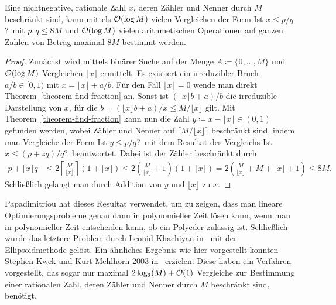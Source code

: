 \begin{theorem}\label{theorem-find-rational}
	Eine nichtnegative, rationale Zahl $x$, deren Zähler und Nenner durch $M$ beschränkt sind, kann mittels $\mathcal{O}(\log M)$ vielen Vergleichen der Form \glqq Ist $x\leq p/q$?\grqq\ mit $p,q\leq 8M$ und $\mathcal{O}(\log M)$ vielen arithmetischen Operationen auf ganzen Zahlen von Betrag maximal $8M$ bestimmt werden.
\end{theorem}
\begin{proof}
	\newcommand{\lowx}{\lfloor x \rfloor}
	Zunächst wird mittels binärer Suche auf der Menge $A\coloneq \{0,\dots, M\}$ und $\mathcal{O}(\log M)$ Vergleichen $\lowx$ ermittelt.
	Es existiert ein irreduzibler Bruch $a/b\in[0,1)$ mit $x=\lowx + a/b$.
	Für den Fall $\lowx = 0$ wende man direkt Theorem~\ref{theorem-find-fraction} an.
	Sonst ist $(\lowx b + a)/b$ die irreduzible Darstellung von $x$, für die $b = (\lowx b+a)/x \leq M/\lowx$ gilt.
	Mit Theorem~\ref{theorem-find-fraction} kann nun die Zahl $y\coloneq x-\lowx\in(0,1)$ gefunden werden, wobei Zähler und Nenner auf $\lceil M/\lowx \rceil$ beschränkt sind, indem man Vergleiche der Form \glqq Ist $y\leq p/q$?\grqq\ mit dem Resultat des Vergleichs \glqq Ist $x\leq (p + zq)/q$?\grqq\ beantwortet.
	Dabei ist der Zähler beschränkt durch \begin{align*}
	p+\lowx q &\leq 2 \left\lceil \frac{M}{\lowx} \right\rceil (1+\lowx) \leq 2 \left(\frac{M}{\lowx} + 1\right)(1+\lowx)
	= 2\left(\frac{M}{\lowx} + M + \lowx + 1\right) \leq 8M.
	\end{align*}
	Schließlich gelangt man durch Addition von $y$ und $\lowx$ zu $x$.
\end{proof}

Papadimitriou hat dieses Resultat verwendet, um zu zeigen, dass man lineare Optimierungsprobleme genau dann in polynomieller Zeit lösen kann, wenn man in polynomieller Zeit entscheiden kann, ob ein Polyeder zulässig ist.
Schließlich wurde das letztere Problem durch Leonid Khachiyan in~\cite{Kha79} mit der Ellipsoidmethode gelöst.
Ein ähnliches Ergebnis wie hier vorgestellt konnten Stephen Kwek und Kurt Mehlhorn 2003 in~\cite{Kwek:2003} erzielen:
Diese haben ein Verfahren vorgestellt, das sogar nur maximal $2\log_2(M) + \mathcal{O}(1)$ Vergleiche zur Bestimmung einer rationalen Zahl, deren Zähler und Nenner durch $M$ beschränkt sind, benötigt.